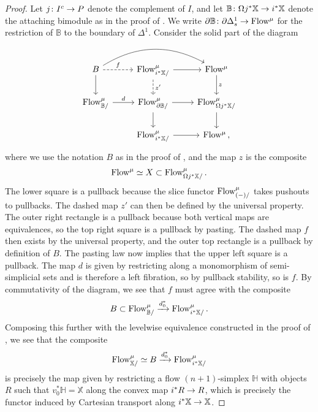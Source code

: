 \documentclass[10pt]{amsart}
\numberwithin{equation}{section}
\theoremstyle{definition}
\newcommand{\PreFlow}{\mathrm{Flow}\vphantom{w}}
\newcommand{\bB}{\mathbb{B}}
\newcommand{\bH}{\mathbb{H}}
\newcommand{\bX}{\mathbb{X}}
\newcommand{\del}{\partial}
\renewcommand{\to}{\mathchoice{\longrightarrow}{\rightarrow}{}{}}
\begin{document}
\begin{proof}
	Let $j\colon I^{c} \to P$ denote the complement of $I$, and let $\bB \colon \Omega j^{*}\bX \to i^{*}\bX$ denote the attaching bimodule as in the proof of .
  We write $\del \bB\colon \del \Delta^{1}_{s} \to \PreFlow^{\mu}$ for the restriction of $\bB$ to the boundary of $\Delta^{1}$.
  Consider the solid part of the diagram
	\begin{equation*}
		\begin{tikzcd}
			B \arrow[r, "f", dashed] \arrow[d] \arrow[rr, bend left]      &   \PreFlow^{\mu}_{i^{*}\bX/}  \arrow[d, "z'", dashed]  \arrow[r] & \PreFlow^{\mu} \arrow[d, "z"] \\
			\PreFlow^{\mu}_{\bB/}  \arrow[r, "d"]               &   \PreFlow^{\mu}_{\partial \bB /}  \arrow[r] \arrow[d]           & \PreFlow^{\mu}_{\Omega j^{*}\bX/}\arrow[d] \\
			&
			\PreFlow^{\mu}_{i^{*}\bX/} \arrow[r] & \PreFlow^{\mu} \, ,
		\end{tikzcd}
	\end{equation*}
	where we use the notation $B$ as in the proof of , and the map $z$ is the composite
	\begin{align*}
		\PreFlow^{\mu} \simeq X \subset \PreFlow^{\mu}_{\Omega j^{*}\bX/} \,.
	\end{align*}
	The lower square is a pullback because the slice functor $\PreFlow^{\mu}_{(-)/}$ takes pushouts to pullbacks.
  The dashed map $z'$ can then be defined by the universal property.
  The outer right rectangle is a pullback because both vertical maps are equivalences, so the top right square is a pullback by pasting.
  The dashed map $f$ then exists by the universal property, and the outer top rectangle is a pullback by definition of $B$.
  The pasting law now implies that the upper left square is a pullback.
  The map $d$ is given by restricting along a monomorphism of semi-simplicial sets and is therefore a left fibration, so by pullback stability, so is $f$.
  By commutativity of the diagram, we see that $f$ must agree with the composite
	\begin{align*}
		B \subset \PreFlow^{\mu}_{\bB/} \xrightarrow{d_{0}^{*}} \PreFlow^{\mu}_{i^{*}\bX/} \,.
	\end{align*}
	Composing this further with the levelwise equivalence constructed in the proof of , we see that the composite
	\begin{align*}
		\PreFlow^{\mu}_{\bX/} \simeq B \xrightarrow{d_{0}^{*}} \PreFlow^{\mu}_{i^{*}\bX/}
	\end{align*}
	is precisely the map given by restricting a flow $(n+1)$-simplex $\bH$ with objects $R$ such that $v_0^{*}\bH =\bX$ along the convex map $i^{*}R \to R$, which is precisely the functor induced by Cartesian transport along $i^{*}\bX \to \bX$.
\end{proof}
\end{document}
